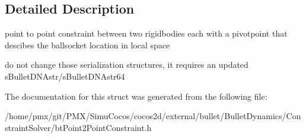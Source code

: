 \subsection{Detailed Description}
point to point constraint between two rigidbodies each with a pivotpoint that descibes the \textquotesingle{}ballsocket\textquotesingle{} location in local space 

do not change those serialization structures, it requires an updated s\+Bullet\+D\+N\+Astr/s\+Bullet\+D\+N\+Astr64 

The documentation for this struct was generated from the following file\+:\begin{DoxyCompactItemize}
\item 
/home/pmx/git/\+P\+M\+X/\+Simu\+Cocos/cocos2d/external/bullet/\+Bullet\+Dynamics/\+Constraint\+Solver/bt\+Point2\+Point\+Constraint.\+h\end{DoxyCompactItemize}

